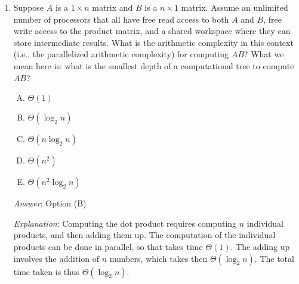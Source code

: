 \documentclass[10pt]{amsart}
\begin{document}
\begin{enumerate}
  {\em Historical note (last time)}: $19$ out of $26$ got
  this. $5$ chose (D), $2$ chose (B).

  \vspace{1in}

  Adding $n$ numbers to each other requires $n - 1$ addition
  operations. In a non-parallel setting, there is no way of improving
  this.

  However, using the associativity of addition, we can write a faster
  parallelizable algorithm. A simple parallelization is to split the
  list being added into two sublists of length about $n/2$
  each. Delegate the task of adding up within each sublist to
  different processors running in parallel. Then, add up the numbers
  obtained. This takes about half the time, with a little overhead (of
  collecting and adding up). This type of strategy is called a {\em
    divide and conquer} strategy. Using a divide and conquer strategy
  repeatedly, we can demonstrate that the parallelized arithmetic
  complexity of this approach is $\Theta(\log_2n)$.

\item Suppose $A$ is a $1 \times n$ matrix and $B$ is a $n \times 1$
  matrix. Assume an unlimited number of processors that all have free
  read access to both $A$ and $B$, free write access to the product
  matrix, and a shared workspace where they can store intermediate
  results. What is the arithmetic complexity in this context (i.e.,
  the parallelized arithmetic complexity) for computing $AB$? What we
  mean here is: what is the smallest depth of a computational tree to
  compute $AB$?

  \begin{enumerate}[(A)]
  \item $\Theta(1)$
  \item $\Theta(\log_2 n)$
  \item $\Theta(n \log_2 n)$
  \item $\Theta(n^2)$
  \item $\Theta(n^2 \log_2 n)$
  \end{enumerate}

  {\em Answer}: Option (B)

  {\em Explanation}: Computing the dot product requires computing $n$
  individual products, and then adding them up. The computation of the
  individual products can be done in parallel, so that takes time
  $\Theta(1)$. The adding up involves the addition of $n$ numbers,
  which takes then $\Theta(\log_2n)$.  The total time taken is thus
  $\Theta(\log_2 n)$.


\end{enumerate}
\end{document}
